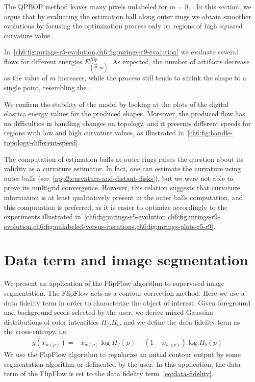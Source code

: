 The QPBOP method leaves many pixels unlabeled for $m=0$, . In this section, we argue that by evaluating the estimation ball along outer rings we obtain smoother evolutions by focusing the optimization process only on regions of high squared curvature value.

In~\cref{ch6:fig:mrings-r5-evolution,ch6:fig:mrings-r9-evolution} we evaluate several flows for different energies $E_{(\vec{\theta},m)}^{flip}$. As expected, the number of artifacts decrease as the value of $m$ increases, while the process still tends to shrink the shape to a single point, resembling the . 

We confirm the stability of the model by looking at the plots of the digital elastica energy values for the produced shapes. Moreover, the produced flow has no difficulties in handling changes on topology, and it presents different speeds for regions with low and high curvature values, as illustrated in~\cref{ch6:fig:handle-topology-different-speed}.

The computation of estimation balls at outer rings raises the question about its validity as a curvature estimator. In fact, one can estimate the curvature using outer balls (see~\cref{app2:curvature-and-distant-disks}), but we were not able to prove its multigrid convergence. However, this relation suggests that curvature information is at least qualitatively present in the outer balls computation, and this computation is preferred, as it is easier to optimize accordingly to the experiments illustrated in~\cref{ch6:fig:mrings-r5-evolution,ch6:fig:mrings-r9-evolution,ch6:fig:unlabeled-versus-iterations,ch6:fig:mrings-plots-r5-r9}.




\section{Data term and image segmentation}
\label{ch6:sec:data-term-image-segmentation}

We present an application of the FlipFlow algorithm to supervised image segmentation. The FlipFlow acts as a contour correction method. Here we use a data fidelity term in order to characterize the object of interest. Given foreground and background seeds selected by the user, we derive mixed Gaussian distributions of color intensities $H_f$,$H_b$, and we define the data fidelity term as the cross-entropy, i.e.
\begin{align}
  g(x_{w(p)}) = -x_{w(p)}\log{H_f(p)} - (1-x_{w(p)})\log{H_b(p)}
  \label{eq:data-fidelity}
\end{align}	
%
We use the FlipFlow algorithm to regularize an initial contour output by some segmentation algorithm or delineated by the user. In this application, the data term of the FlipFlow
is set to the data fidelity term~\cref{eq:data-fidelity}.
	
